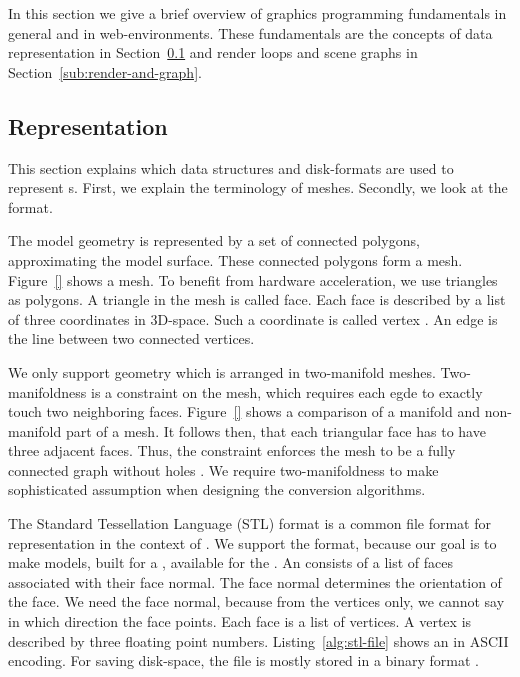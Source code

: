 \documentclass[../ClassicThesis.tex]{subfiles}
\begin{document}
In this section we give a brief overview of graphics programming
fundamentals in general and in web-environments. These fundamentals
are the concepts of {\threedmodel} data representation in
Section~\ref{sub:model-representation} and render loops and scene
graphs in Section~\ref{sub:render-and-graph}.

\subsection{{\threedmodel} Representation}
\label{sub:model-representation}

This section explains which data structures and disk-formats are used
to represent {\threedmodel}s. First, we explain the terminology of
meshes. Secondly, we look at the {\stlfile} format.

The model geometry is represented by a set of connected polygons,
approximating the model surface. These connected polygons form a mesh.
Figure~\ref{} shows a mesh. To benefit from hardware acceleration, we use
triangles as polygons. A triangle in the mesh is called face. Each
face is described by a list of three coordinates in 3D-space. Such a
coordinate is called vertex \cite[p.~3]{cg-intro}. An edge is the line
between two connected vertices.

We only support geometry which is arranged in two-manifold meshes.
Two-manifoldness is a constraint on the mesh, which requires each egde
to exactly touch two neighboring faces. Figure~\ref{}
shows a comparison of a manifold and non-manifold part of a mesh. It
follows then, that each triangular face has to have three adjacent
faces. Thus, the constraint enforces the mesh to be a fully connected
graph without holes \cite[p.~28]{master-thesis}. We require
two-manifoldness to make
sophisticated assumption when designing the conversion algorithms.

The Standard Tessellation Language (STL) format is a common file
format for {\threedmodel} representation in the context of
{\threedprinting}. We support the {\stlfile} format, because our goal
is to make models, built for a {\threedprinter}, available for the
{\lasercutter}. An {\stlfile} consists of a list of faces associated
with their face normal. The face normal determines the orientation of
the face. We need the face normal, because from the vertices only, we
cannot say in which direction the face points. Each face is a list of
vertices. A vertex is described by three floating point numbers.
Listing~\ref{alg:stl-file} shows an {\stlfile} in ASCII encoding. For
saving disk-space, the file is mostly stored in a binary format
\cite[p.~8]{stl-file}.
\end{document}
